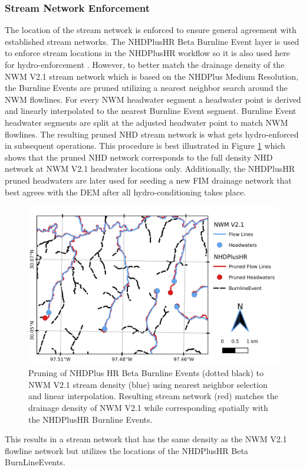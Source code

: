 \documentclass[draft]{dependencies/agujournal2019}
\begin{document}
\subsubsection{Stream Network Enforcement} 
\label{ssec:stream_network_enforcment}
%
The location of the stream network is enforced to ensure general agreement with established stream networks.
The NHDPlusHR Beta Burnline Event layer is used to enforce stream locations in the NHDPlusHR workflow so it is also used here for hydro-enforcement \cite{moore2019user}. 
However, to better match the drainage density of the NWM V2.1 stream network which is based on the NHDPlus Medium Resolution, the Burnline Events are pruned utilizing a nearest neighbor search around the NWM flowlines.
For every NWM headwater segment a headwater point is derived and linearly interpolated to the nearest Burnline Event segment.
Burnline Event headwater segments are split at the adjusted headwater point to match NWM flowlines.
The resulting pruned NHD stream network is what gets hydro-enforced in subsequent operations.
This procedure is best illustrated in Figure \ref{fig:stream_density_pruning} which shows that the pruned NHD network corresponds to the full density NHD network at NWM V2.1 headwater locations only. 
Additionally, the NHDPlusHR pruned headwaters are later used for seeding a new FIM drainage network that best agrees with the DEM after all hydro-conditioning takes place.
%
\begin{figure}[h!]
\centering
\includegraphics[scale=1.0]{figures/headwaters.jpg}
\caption{Pruning of NHDPlus HR Beta Burnline Events (dotted black) to NWM V2.1 stream density (blue) using nearest neighbor selection and linear interpolation. Resulting stream network (red) matches the drainage density of NWM V2.1 while corresponding spatially with the NHDPlusHR Burnline Events.}
\label{fig:stream_density_pruning}
\end{figure}
%
This results in a stream network that has the same density as the NWM V2.1 flowline network but utilizes the locations of the NHDPlusHR Beta BurnLineEvents. 
\end{document}
